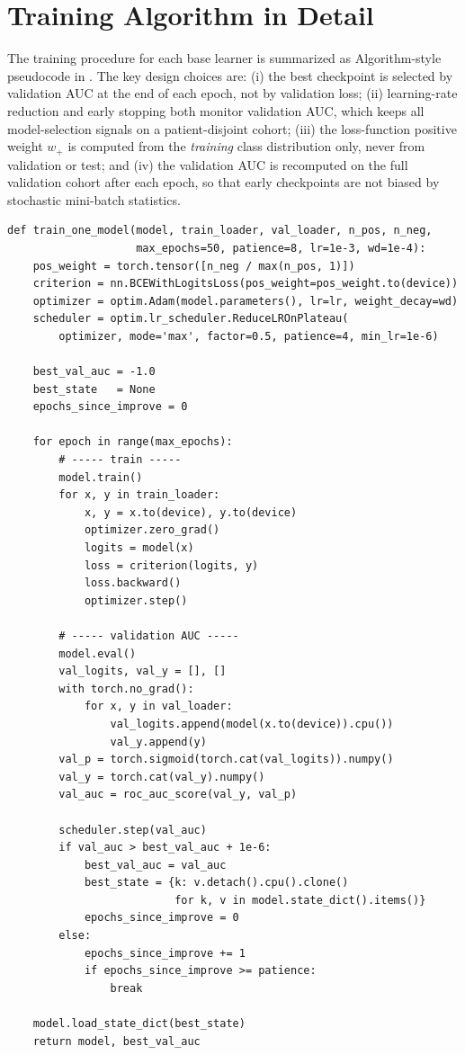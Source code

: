 \section{Training Algorithm in Detail}
\label{sec:training-algorithm}

The training procedure for each base learner is summarized as Algorithm-style pseudocode in . The key design choices are: (i) the best checkpoint is selected by validation AUC at the end of each epoch, not by validation loss; (ii) learning-rate reduction and early stopping both monitor validation AUC, which keeps all model-selection signals on a patient-disjoint cohort; (iii) the loss-function positive weight $w_{+}$ is computed from the \textit{training} class distribution only, never from validation or test; and (iv) the validation AUC is recomputed on the full validation cohort after each epoch, so that early checkpoints are not biased by stochastic mini-batch statistics.

\begin{lstlisting}[caption={Training loop for a single base learner (paraphrased from \texttt{approaches/mi\_detection\_prod/train.py}).}, label={lst:train-loop}]
def train_one_model(model, train_loader, val_loader, n_pos, n_neg,
                    max_epochs=50, patience=8, lr=1e-3, wd=1e-4):
    pos_weight = torch.tensor([n_neg / max(n_pos, 1)])
    criterion = nn.BCEWithLogitsLoss(pos_weight=pos_weight.to(device))
    optimizer = optim.Adam(model.parameters(), lr=lr, weight_decay=wd)
    scheduler = optim.lr_scheduler.ReduceLROnPlateau(
        optimizer, mode='max', factor=0.5, patience=4, min_lr=1e-6)

    best_val_auc = -1.0
    best_state   = None
    epochs_since_improve = 0

    for epoch in range(max_epochs):
        # ----- train -----
        model.train()
        for x, y in train_loader:
            x, y = x.to(device), y.to(device)
            optimizer.zero_grad()
            logits = model(x)
            loss = criterion(logits, y)
            loss.backward()
            optimizer.step()

        # ----- validation AUC -----
        model.eval()
        val_logits, val_y = [], []
        with torch.no_grad():
            for x, y in val_loader:
                val_logits.append(model(x.to(device)).cpu())
                val_y.append(y)
        val_p = torch.sigmoid(torch.cat(val_logits)).numpy()
        val_y = torch.cat(val_y).numpy()
        val_auc = roc_auc_score(val_y, val_p)

        scheduler.step(val_auc)
        if val_auc > best_val_auc + 1e-6:
            best_val_auc = val_auc
            best_state = {k: v.detach().cpu().clone()
                          for k, v in model.state_dict().items()}
            epochs_since_improve = 0
        else:
            epochs_since_improve += 1
            if epochs_since_improve >= patience:
                break

    model.load_state_dict(best_state)
    return model, best_val_auc
\end{lstlisting}

